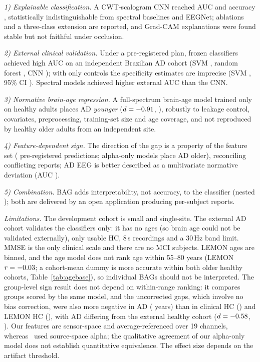 \documentclass[journal]{IEEEtran}
\begin{document}
\emph{1) Explainable classification.} A CWT-scalogram CNN reached AUC \cnnAUC{} and accuracy \cnnAcc{}, statistically indistinguishable from spectral baselines and EEGNet; ablations and a three-class extension are reported, and Grad-CAM explanations were found stable but not faithful under occlusion.

\emph{2) External clinical validation.} Under a pre-registered plan, frozen classifiers achieved high AUC on an independent Brazilian AD cohort (SVM \extFrozenSvmAUC{}, random forest \extFrozenRfAUC{}, CNN \extFrozenCnnAUC{}); with only \extNhc{} controls the specificity estimates are imprecise (SVM \extFrozenSvmSpec{}, 95\% CI \extFrozenSvmSpecCI{}). Spectral models achieved higher external AUC than the CNN.

\emph{3) Normative brain-age regression.} A full-spectrum brain-age model trained only on healthy adults places AD \emph{younger} ($d=-0.91{}$, \bagDci{}), robustly to leakage control, covariates, preprocessing, training-set size and age coverage, and not reproduced by healthy older adults from an independent site.

\emph{4) Feature-dependent sign.} The direction of the gap is a property of the feature set (\famAgree{} pre-registered predictions; alpha-only models place AD older), reconciling conflicting reports; AD EEG is better described as a multivariate normative deviation (AUC \normAUC{}).

\emph{5) Combination.} BAG adds interpretability, not accuracy, to the classifier (nested \nestDiffP{}); both are delivered by an open application producing per-subject reports.

\emph{Limitations.} The development cohort is small and single-site. The external AD cohort validates the classifiers only: it has no ages (so brain age could not be validated externally), only \extNhc{} usable HC, 8\,s recordings and a 30\,Hz band limit. MMSE is the only clinical scale and there are no MCI subjects. LEMON ages are binned, and the age model does not rank age within 55--80 years (LEMON $r=-0.03{}$; a cohort-mean dummy is more accurate within both older healthy cohorts, Table~\ref{tab:agebase}), so individual BAGs should not be interpreted. The group-level sign result does not depend on within-range ranking: it compares groups scored by the same model, and the uncorrected gaps, which involve no bias correction, were also more negative in AD (\rawGapAd{} years) than in clinical HC (\rawGapHc{}) and LEMON HC (\rawGapLem{}), with AD differing from the external healthy cohort ($d=-0.58{}$, \lemADp{}). Our features are sensor-space and average-referenced over 19 channels, whereas~\cite{otero2026} used source-space alpha; the qualitative agreement of our alpha-only model does not establish quantitative equivalence. The effect size depends on the artifact threshold.
\end{document}
